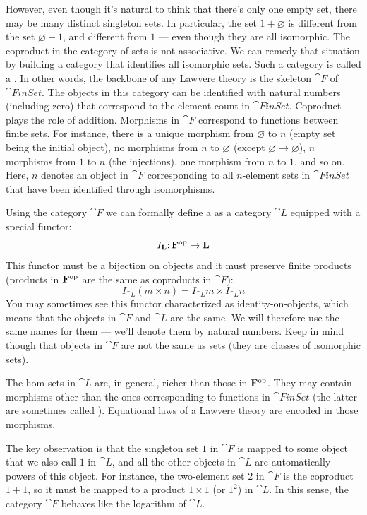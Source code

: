 However, even though it's natural to think that there's only one empty
set, there may be many distinct singleton sets. In particular, the set
$1 + \varnothing$ is different from the set $\varnothing + 1$, and
different from $1$ --- even though they are all isomorphic. The
coproduct in the category of sets is not associative. We can remedy that
situation by building a category that identifies all isomorphic sets.
Such a category is called a . In other words, the
backbone of any Lawvere theory is the skeleton $\cat{F}$ of
$\cat{FinSet}$. The objects in this category can be identified with
natural numbers (including zero) that correspond to the element count in
$\cat{FinSet}$. Coproduct plays the role of addition. Morphisms in
$\cat{F}$ correspond to functions between finite sets. For instance,
there is a unique morphism from $\varnothing$ to $n$ (empty set
being the initial object), no morphisms from $n$ to $\varnothing$
(except $\varnothing \to \varnothing$), $n$ morphisms from $1$ to
$n$ (the injections), one morphism from $n$ to $1$,
and so on. Here, $n$ denotes an object in $\cat{F}$
corresponding to all $n$-element sets in $\cat{FinSet}$ that have been
identified through isomorphisms.

Using the category $\cat{F}$ we can formally define a  as a category $\cat{L}$ equipped with a special functor:
\[I_{\mathbf{L}} \mathpunct{:} \mathbf{F}^{\mathrm{op}} \to \mathbf{L}\]
This functor must be a bijection on objects and it must preserve finite
products (products in $\mathbf{F}^{\mathrm{op}}$ are the same as
coproducts in $\cat{F}$):
\[I_{\cat{L}} (m\times{}n) = I_{\cat{L}} m\times{}I_{\cat{L}} n\]
You may sometimes see this functor characterized as identity-on-objects,
which means that the objects in $\cat{F}$ and $\cat{L}$ are the same.
We will therefore use the same names for them --- we'll denote them by
natural numbers. Keep in mind though that objects in $\cat{F}$ are not
the same as sets (they are classes of isomorphic sets).

The hom-sets in $\cat{L}$ are, in general, richer than those in
$\mathbf{F}^{\mathrm{op}}$. They may contain morphisms other than
the ones corresponding to functions in $\cat{FinSet}$ (the latter are
sometimes called ). Equational laws of a
Lawvere theory are encoded in those morphisms.

The key observation is that the singleton set $1$ in $\cat{F}$
is mapped to some object that we also call $1$ in $\cat{L}$, and
all the other objects in $\cat{L}$ are automatically powers of this
object. For instance, the two-element set $2$ in $\cat{F}$ is
the coproduct $1 + 1$, so it must be mapped to a product
$1 \times 1$ (or $1^2$) in $\cat{L}$. In this sense, the category
$\cat{F}$ behaves like the logarithm of $\cat{L}$.

